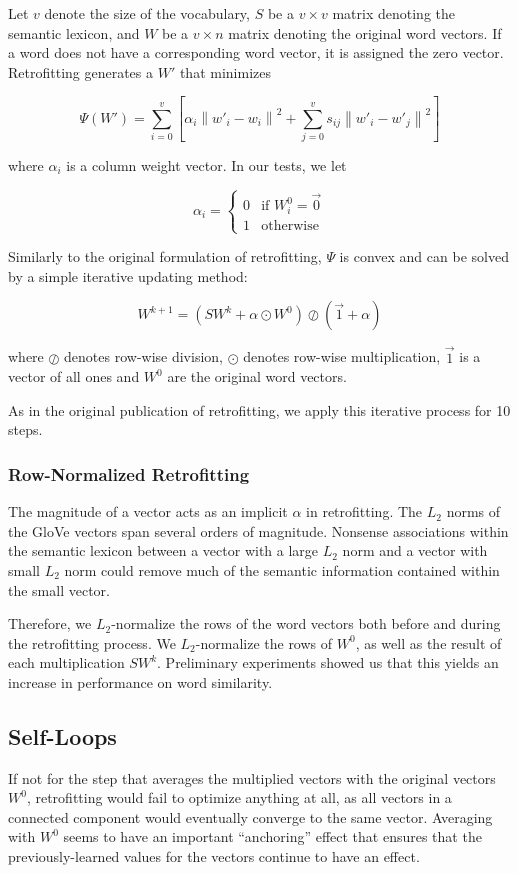 \documentclass[letterpaper]{article}
\begin{document}
Let $v$ denote the size of the vocabulary, $S$ be a $v \times v$ matrix denoting
the semantic lexicon, and $W$ be a $v \times n$ matrix denoting the original
word vectors. If a word does not have a corresponding word vector, it is
assigned the zero vector. Retrofitting generates a $W'$ that minimizes

$$
\Psi \left( W' \right) = \sum_{i=0}^v \left[
  \alpha_i \left\|  w'_i - w_i \right\| ^ 2
  + \sum_{j=0}^v s_{ij} \left\| w'_i - w'_j \right\| ^ 2
\right]
$$

where $\alpha_i$ is a column weight vector. In our tests, we let

$$
\alpha_i =
  \begin{cases}
    0 & \text{if $W^0_i = \vec{0}$} \\
    1 & \text{otherwise}
  \end{cases}
$$

Similarly to the original formulation of retrofitting, $\Psi$ is convex and can
be solved by a simple iterative updating method:

$$
W^{k+1} = \left( S W^k + \alpha \odot W^0 \right)
\oslash \left( \vec{1} + \alpha \right)
$$

where $\oslash$ denotes row-wise division, $\odot$ denotes row-wise
multiplication, $\vec{1}$ is a vector of all ones and $W^0$ are the original
word vectors.

As in the original publication of retrofitting, we apply this iterative process
for 10 steps.

\subsubsection{Row-Normalized Retrofitting}

The magnitude of a vector acts as an implicit $\alpha$ in retrofitting.
The $L_2$ norms of the GloVe vectors span several orders of magnitude.
Nonsense associations within the semantic lexicon between a vector with a large
$L_2$ norm and a vector with small $L_2$ norm could remove much of the semantic
information contained within the small vector.

Therefore, we $L_2$-normalize
the rows of the word vectors both before and during the retrofitting process.
We $L_2$-normalize the rows of $W^0$, as well as the result of each
multiplication $S W^k$. Preliminary experiments showed us that this yields
an increase in performance on word similarity.

\subsection{Self-Loops}
If not for the step that averages the multiplied vectors with the original
vectors $W^0$, retrofitting would fail to optimize anything at all, as all
vectors in a connected component would eventually converge to the same vector.
Averaging with $W^0$ seems to have an important ``anchoring'' effect that
ensures that the previously-learned values for the vectors continue to have
an effect.
\end{document}
